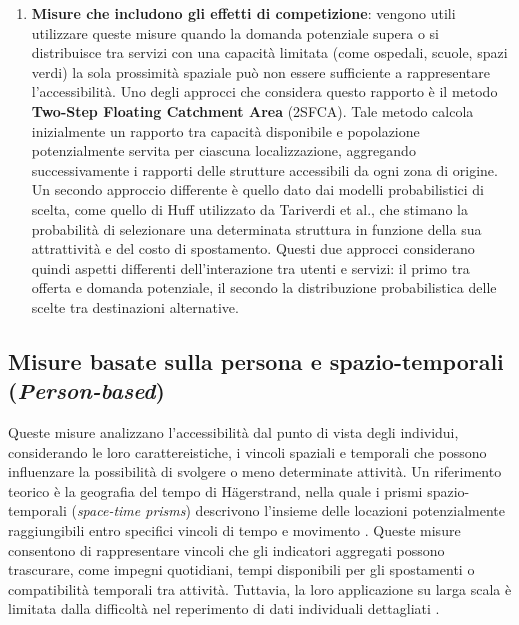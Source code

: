\begin{enumerate}
        \item \textbf{Misure che includono gli effetti di competizione}: vengono utili utilizzare queste misure quando la domanda potenziale supera o si distribuisce tra servizi con una capacità limitata (come ospedali, scuole, spazi verdi) la sola prossimità spaziale può non essere sufficiente a rappresentare l'accessibilità. \cite{geurs2004}
        Uno degli approcci che considera questo rapporto è il metodo \textbf{Two-Step Floating Catchment Area} (2SFCA). Tale metodo calcola inizialmente un rapporto tra capacità disponibile e popolazione potenzialmente servita per ciascuna localizzazione, aggregando successivamente i rapporti delle strutture accessibili da ogni zona di origine. \cite{luo2003}
        Un secondo approccio differente è quello dato dai modelli probabilistici di scelta, come quello di Huff utilizzato da Tariverdi et al., che stimano la probabilità di selezionare una determinata struttura in funzione della sua attrattività e del costo di spostamento.
        Questi due approcci considerano quindi aspetti differenti dell'interazione tra utenti e servizi: il primo tra offerta e domanda potenziale, il secondo la distribuzione probabilistica delle scelte tra destinazioni alternative. \cite{luo2003,tariverdi2023}
        
\end{enumerate}

\subsection{Misure basate sulla persona e spazio-temporali (\textit{Person-based})}
Queste misure analizzano l'accessibilità dal punto di vista degli individui, considerando le loro carattereistiche, i vincoli spaziali e temporali che possono influenzare la possibilità di svolgere o meno determinate attività.
Un riferimento teorico è la geografia del tempo di Hägerstrand, nella quale i prismi spazio-temporali (\textit{space-time prisms})  descrivono l'insieme delle locazioni potenzialmente raggiungibili entro specifici vincoli di tempo e movimento \cite{hagerstrand1970,geurs2004}.
Queste misure consentono di rappresentare vincoli che gli indicatori aggregati possono trascurare, come impegni quotidiani, tempi disponibili per gli spostamenti o compatibilità temporali tra attività. Tuttavia, la loro applicazione su larga scala è limitata dalla difficoltà nel reperimento di dati individuali dettagliati \cite{geurs2004}.

